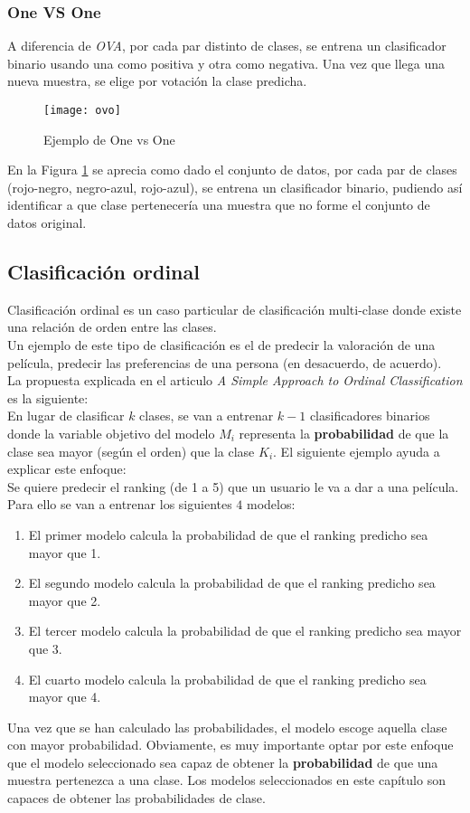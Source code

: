 \subsubsection*{One VS One}
A diferencia de \textit{OVA}, por cada par distinto de clases, se entrena un clasificador binario usando una como positiva y otra como negativa. Una vez que llega una nueva muestra, se elige por votación la clase predicha.
\begin{figure}[H]
	\centering
	\texttt{[image: ovo]}
	\caption{Ejemplo de One vs One}
	\label{fig:ovo}
\end{figure}
En la Figura \ref{fig:ovo} se aprecia como dado el conjunto de datos, por cada par de clases (rojo-negro, negro-azul, rojo-azul), se entrena un clasificador binario, pudiendo así identificar a que clase pertenecería una muestra que no forme el conjunto de datos original.
\subsection{Clasificación ordinal}
\label{sec:ord_class}
Clasificación ordinal es un caso particular de clasificación multi-clase donde existe una relación de orden entre las clases.\\
Un ejemplo de este tipo de clasificación es el de predecir la valoración de una película, predecir las preferencias de una persona (en desacuerdo, de acuerdo).\\
\linebreak
La propuesta explicada en el articulo \textit{A Simple Approach to Ordinal Classification} es la siguiente:\\
\linebreak
En lugar de clasificar $k$ clases, se van a entrenar $k-1$ clasificadores binarios donde la variable objetivo del modelo $M_i$ representa la \textbf{probabilidad} de que la clase sea mayor (según el orden) que la clase $K_i$. El siguiente ejemplo ayuda a explicar este enfoque:\\
\linebreak
Se quiere predecir el ranking (de 1 a 5) que un usuario le va a dar a una película. Para ello se van a entrenar los siguientes $4$ modelos:
\begin{enumerate}
	\item El primer modelo calcula la probabilidad de que el ranking predicho sea mayor que 1.
	\item El segundo modelo calcula la probabilidad de que el ranking predicho sea mayor que 2.
	\item El tercer modelo calcula la probabilidad de que el ranking predicho sea mayor que 3.
	\item El cuarto modelo calcula la probabilidad de que el ranking predicho sea mayor que 4.
\end{enumerate}
Una vez que se han calculado las probabilidades, el modelo escoge aquella clase con mayor probabilidad. Obviamente, es muy importante optar por este enfoque que el modelo seleccionado sea capaz de obtener la \textbf{probabilidad} de que una muestra pertenezca a una clase. Los modelos seleccionados en este capítulo son capaces de obtener las probabilidades de clase.
